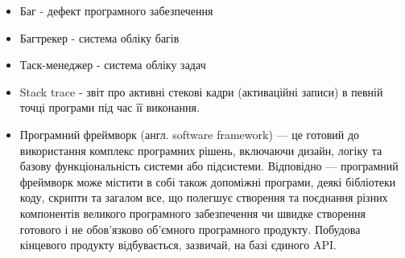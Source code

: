 \documentclass[../main.tex]{subfiles}
\begin{document}

\begin{itemize}
    \item Баг - дефект програмного забезпечення
    \item Багтрекер - система обліку багів
    \item Таск-менеджер - система обліку задач
    \item Stack trace - звіт про активні стекові кадри (активаційні записи) в певній точці програми під час її виконання.
    \item Програмний фреймворк (англ. software framework) — це готовий до використання комплекс програмних рішень, включаючи дизайн, логіку та базову функціональність системи або підсистеми. Відповідно — програмний фреймворк може містити в собі також допоміжні програми, деякі бібліотеки коду, скрипти та загалом все, що полегшує створення та поєднання різних компонентів великого програмного забезпечення чи швидке створення готового і не обов'язково об'ємного програмного продукту. Побудова кінцевого продукту відбувається, зазвичай, на базі єдиного API.
\end{itemize}
\end{document}
